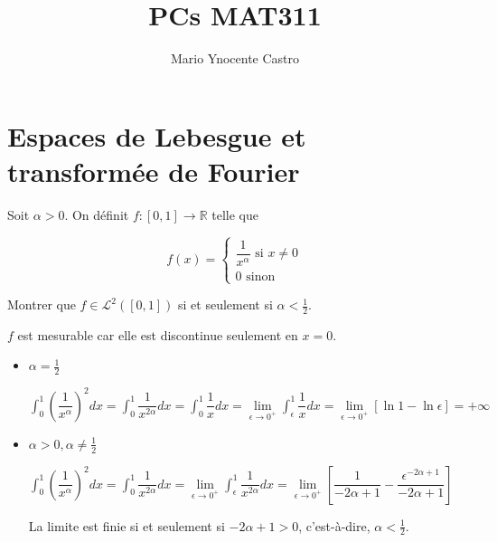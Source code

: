 \documentclass[10pt,a4paper,oneside]{article}
\newenvironment{exercice}[1][Exercice]{\begin{trivlist}
\item[\hskip \labelsep {\bfseries #1}]}{\end{trivlist}}
\newenvironment{solution}[1][Solution]{\begin{trivlist}
\item[\hskip \labelsep {\bfseries #1}]}{\end{trivlist}}
\begin{document}
\title{PCs MAT311}
\author{Mario Ynocente Castro}

\maketitle

\section{Espaces de Lebesgue et transformée de Fourier}

\begin{exercice}
Soit $\alpha > 0$. On définit $f : [0,1] \to \mathbb{R}$ telle que

\[f(x) = \begin{cases}
\dfrac{1}{x^\alpha} \text{ si } x \neq 0 \\
0 \text{ sinon}
\end{cases}\]

Montrer que $f \in \mathcal{L}^2([0,1]) $ si et seulement si $\alpha < \frac{1}{2}$.

\begin{solution}

$f$ est mesurable car elle est discontinue seulement en $x = 0$.

\begin{itemize}

\item
$\alpha = \frac{1}{2}$

$\int_0^1 \left(\dfrac{1}{x^\alpha}\right)^2 dx = \int_0^1 \dfrac{1}{x^{2\alpha}}dx = \int_0^1 \dfrac{1}{x}dx = \underset{\epsilon \to 0^+}{\lim} \int_\epsilon^1 \dfrac{1}{x}dx = \underset{\epsilon \to 0^+}{\lim}[\ln 1 - \ln \epsilon] = +\infty$

\item
$\alpha > 0, \alpha \neq \frac{1}{2}$

$\int_0^1 \left(\dfrac{1}{x^\alpha}\right)^2 dx = \int_0^1 \dfrac{1}{x^{2\alpha}}dx = \underset{\epsilon \to 0^+}{\lim} \int_\epsilon^1 \dfrac{1}{x^{2\alpha}}dx = \underset{\epsilon \to 0^+}{\lim}\left[ \dfrac{1}{-2\alpha + 1} - \dfrac{\epsilon^{-2\alpha + 1}}{-2\alpha + 1} \right]$

La limite est finie si et seulement si $-2\alpha + 1 > 0$, c'est-à-dire, $\alpha < \frac{1}{2}$.

\end{itemize}

\end{solution}

\end{exercice}
\end{document}
